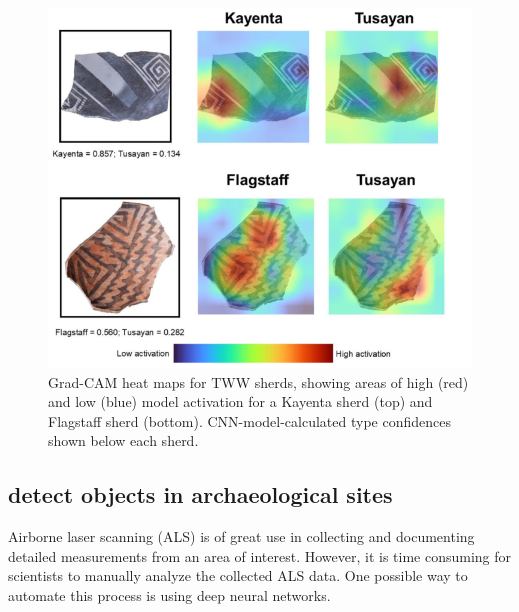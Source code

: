 \documentclass[journal]{IEEEtran}
\begin{document}
\begin{itemize}
\begin{figure}[htbp]
			\centering
			\includegraphics[width=1.0\linewidth]{./picture/fig6.png}
			\caption{ Grad-CAM heat maps for TWW sherds, showing areas of high (red) and low (blue) model activation for a Kayenta sherd (top) and Flagstaff sherd (bottom). 
			CNN-model-calculated type confidences shown below each sherd.}
		  \end{figure}
	\end{itemize}

	\subsection{detect objects in archaeological sites}

	Airborne laser scanning (ALS) is of great use in
	collecting and documenting detailed measurements from an area of interest. However, it is
	time consuming for scientists to manually analyze the collected ALS data. One possible way to
	automate this process is using deep neural networks.
\end{document}
